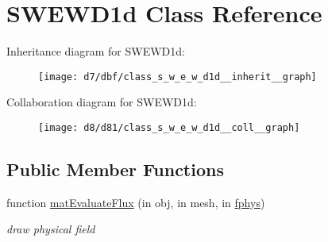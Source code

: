 \hypertarget{class_s_w_e_w_d1d}{}\section{S\+W\+E\+W\+D1d Class Reference}
\label{class_s_w_e_w_d1d}


Inheritance diagram for S\+W\+E\+W\+D1d\+:
\nopagebreak
\begin{figure}[H]
\begin{center}
\leavevmode
\texttt{[image: d7/dbf/class\_s\_w\_e\_w\_d1d\_\_inherit\_\_graph]}
\end{center}
\end{figure}


Collaboration diagram for S\+W\+E\+W\+D1d\+:
\nopagebreak
\begin{figure}[H]
\begin{center}
\leavevmode
\texttt{[image: d8/d81/class\_s\_w\_e\_w\_d1d\_\_coll\_\_graph]}
\end{center}
\end{figure}
\subsection*{Public Member Functions}
\begin{DoxyCompactItemize}
\item 
function \hyperlink{class_s_w_e_w_d1d_a4212cf1a34a87a02fb60f29617d0d004}{mat\+Evaluate\+Flux} (in obj, in mesh, in \hyperlink{class_ndg_phys_a6b25724fc9474d32018439009072f0a9}{fphys})
\begin{DoxyCompactList}\small\item\em draw physical field \end{DoxyCompactList}\end{DoxyCompactItemize}
